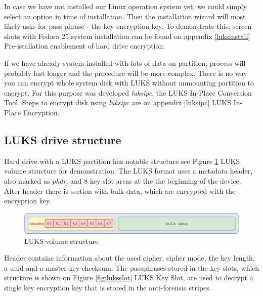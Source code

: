 In case we have not installed our Linux operation system yet, we could simply select an option in time of installation.
Then the installation wizard will most likely asks for pass phrase - the key encryption key.
To demonstrate this, screen shots with Fedora 25 system installation can be found on appendix \ref{luksinstall} Pre-istallation enablement of hard drive encryption.

If we have already system installed with lots of data on partition, process will probably last longer and the procedure will be more complex.
There is no way you can encrypt whole system disk with LUKS without unmounting partition to encrypt.
For this purpose was developed {\it luksipc}, the LUKS In-Place Conversion Tool.
Steps to encrypt disk using {\it luksipc} are on appendix \ref{luksipc} LUKS In-Place Encryption.

\subsection{LUKS drive structure}

Hard drive with a LUKS partition has notable structure see Figure \ref{fig:luksvol} LUKS volume structure for demonstration.
The LUKS format uses a metadata header, also marked as {\it phdr}, and 8 key slot areas at the the beginning of the device.
After header there is section with bulk data, which are encrypted with the encryption key.
\begin{figure}[h]
    \centering
    \includegraphics[scale=0.7]{figures/LUKSdrive.pdf}
    \caption{LUKS volume structure}
    \label{fig:luksvol}
\end{figure}
Header contains information about the used cipher, cipher mode, the key length, a uuid and a master key checksum.
The passphrases stored in the key slots, which structure is shown on Figure \ref{fig:luksslot} LUKS Key Slot, are used to decrypt a single key encryption key that is stored in the anti-forensic stripes.


